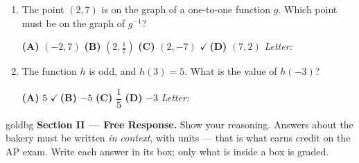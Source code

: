 \documentclass[10pt]{article}
\begin{document}
\begin{enumerate}[leftmargin=1.9em, itemsep=14pt]
\item The point $(2, 7)$ is on the graph of a one-to-one function $g$. Which point must be on
      the graph of $g^{-1}$?

      \smallskip
      \textbf{(A)} $(-2, 7)$ \hspace{2.6em} \textbf{(B)} $\left(2, \tfrac{1}{7}\right)$ \hspace{2.6em} \textbf{(C)} $(2, -7)$ \hspace{2.6em} {\color{keyred}\textbf{$\checkmark$\,(D)}} $(7, 2)$ \hfill\textit{Letter:}~\gradedblank[id=ap4, type=choice, points=1, answer=D]{0.42in}{13pt}

\item The function $h$ is odd, and $h(3) = 5$. What is the value of $h(-3)$?

      \smallskip
      \textbf{(A)} $5$ \hspace{2.6em} {\color{keyred}\textbf{$\checkmark$\,(B)}} $-5$ \hspace{2.6em} \textbf{(C)} $\dfrac{1}{5}$ \hspace{2.6em} \textbf{(D)} $-3$ \hfill\textit{Letter:}~\gradedblank[id=ap5, type=choice, points=1, answer=B]{0.42in}{13pt}

\end{enumerate}

\newpage

\begin{headlinebox}{goldbg}
\small
\textbf{Section II --- Free Response.} Show your reasoning. Answers about the bakery must be
written \emph{in context}, with units --- that is what earns credit on the AP exam. Write each answer in its box; only what is inside a box is graded.
\end{headlinebox}

\vspace{0.08in}
\end{document}
